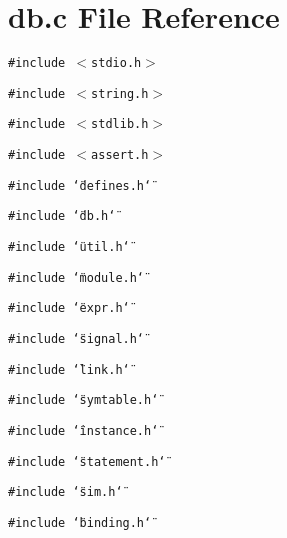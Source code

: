 \section{db.c File Reference}
\label{db_8c}
{\tt \#include $<$stdio.h$>$}\par
{\tt \#include $<$string.h$>$}\par
{\tt \#include $<$stdlib.h$>$}\par
{\tt \#include $<$assert.h$>$}\par
{\tt \#include \char`\"{}defines.h\char`\"{}}\par
{\tt \#include \char`\"{}db.h\char`\"{}}\par
{\tt \#include \char`\"{}util.h\char`\"{}}\par
{\tt \#include \char`\"{}module.h\char`\"{}}\par
{\tt \#include \char`\"{}expr.h\char`\"{}}\par
{\tt \#include \char`\"{}signal.h\char`\"{}}\par
{\tt \#include \char`\"{}link.h\char`\"{}}\par
{\tt \#include \char`\"{}symtable.h\char`\"{}}\par
{\tt \#include \char`\"{}instance.h\char`\"{}}\par
{\tt \#include \char`\"{}statement.h\char`\"{}}\par
{\tt \#include \char`\"{}sim.h\char`\"{}}\par
{\tt \#include \char`\"{}binding.h\char`\"{}}\par
